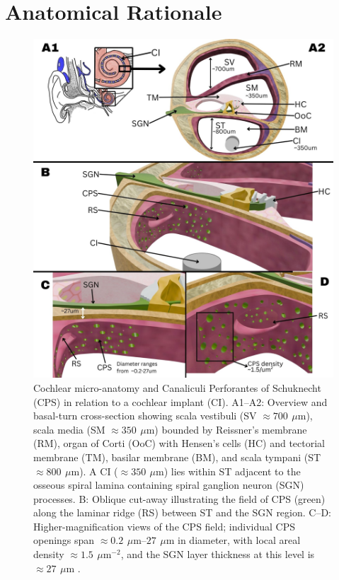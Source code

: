 \documentclass[referee,pdflatex, sn-vancouver-num]{sn-jnl}%
\theoremstyle{thmstyleone}%
\theoremstyle{thmstyletwo}%
\theoremstyle{thmstylethree}%
\newcommand{\um}{\ensuremath{\,\mu\mathrm{m}}}
\DeclareRobustCommand{\textendash}{\ifmmode\text{-}\else\leavevmode\hbox{--}\fi}
\begin{document}
\section{Anatomical Rationale}\label{sec3}
\begin{figure}[ht]
	\centering
	\includegraphics[width=0.89 \textwidth]{JNER_Submission/manuscript/figures/3DAnatomyPanel.jpg}
	\caption{Cochlear micro-anatomy and Canaliculi Perforantes of Schuknecht (CPS) in relation to a cochlear implant (CI). A1\textendash A2: Overview and basal-turn cross-section showing scala vestibuli (SV $\approx \SI{700}{\um}$), scala media (SM $\approx \SI{350}{\um}$) bounded by Reissner’s membrane (RM), organ of Corti (OoC) with Hensen’s cells (HC) and tectorial membrane (TM), basilar membrane (BM), and scala tympani (ST $\approx \SI{800}{\um}$). A CI ($\approx \SI{350}{\um}$) lies within ST adjacent to the osseous spiral lamina containing spiral ganglion neuron (SGN) processes. B: Oblique cut-away illustrating the field of CPS (green) along the laminar ridge (RS) between ST and the SGN region. C–D: Higher-magnification views of the CPS field; individual CPS openings span $\approx\SIrange{0.2}{27}{\um}$ in diameter, with local areal density $\approx\SI{1.5}{\um^{-2}}$, and the SGN layer thickness at this level is $\approx \SI{27}{\um}$ \cite{Schuknecht1959,schuknecht1963,lim1970,masuda1971,tanaka1973,shepherd2004}.}
	\label{fig:cochlea_overview}
\end{figure}
\end{document}
